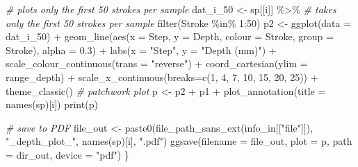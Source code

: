 \documentclass[
]{article}
\newenvironment{Shaded}{\begin{snugshade}}{\end{snugshade}}
\newcommand{\AttributeTok}[1]{\textcolor[rgb]{0.77,0.63,0.00}{#1}}
\newcommand{\CommentTok}[1]{\textcolor[rgb]{0.56,0.35,0.01}{\textit{#1}}}
\newcommand{\DecValTok}[1]{\textcolor[rgb]{0.00,0.00,0.81}{#1}}
\newcommand{\FloatTok}[1]{\textcolor[rgb]{0.00,0.00,0.81}{#1}}
\newcommand{\FunctionTok}[1]{\textcolor[rgb]{0.00,0.00,0.00}{#1}}
\newcommand{\NormalTok}[1]{#1}
\newcommand{\OtherTok}[1]{\textcolor[rgb]{0.56,0.35,0.01}{#1}}
\newcommand{\SpecialCharTok}[1]{\textcolor[rgb]{0.00,0.00,0.00}{#1}}
\newcommand{\StringTok}[1]{\textcolor[rgb]{0.31,0.60,0.02}{#1}}
\begin{document}
\begin{Shaded}
\begin{Highlighting}[]
\CommentTok{\# plots only the first 50 strokes per sample  }
\NormalTok{  dat\_i\_50 }\OtherTok{\textless{}{-}}\NormalTok{ sp[[i]] }\SpecialCharTok{\%\textgreater{}\%} 
              \CommentTok{\# takes only the first 50 strokes per sample}
              \FunctionTok{filter}\NormalTok{(Stroke }\SpecialCharTok{\%in\%} \DecValTok{1}\SpecialCharTok{:}\DecValTok{50}\NormalTok{)}
\NormalTok{  p2 }\OtherTok{\textless{}{-}} \FunctionTok{ggplot}\NormalTok{(}\AttributeTok{data =}\NormalTok{ dat\_i\_50) }\SpecialCharTok{+}
        \FunctionTok{geom\_line}\NormalTok{(}\FunctionTok{aes}\NormalTok{(}\AttributeTok{x =}\NormalTok{ Step, }\AttributeTok{y =}\NormalTok{ Depth, }\AttributeTok{colour =}\NormalTok{ Stroke, }\AttributeTok{group =}\NormalTok{ Stroke), }\AttributeTok{alpha =} \FloatTok{0.3}\NormalTok{) }\SpecialCharTok{+} 
        \FunctionTok{labs}\NormalTok{(}\AttributeTok{x =} \StringTok{"Step"}\NormalTok{, }\AttributeTok{y =} \StringTok{"Depth (mm)"}\NormalTok{) }\SpecialCharTok{+} 
        \FunctionTok{scale\_colour\_continuous}\NormalTok{(}\AttributeTok{trans =} \StringTok{"reverse"}\NormalTok{) }\SpecialCharTok{+} 
        \FunctionTok{coord\_cartesian}\NormalTok{(}\AttributeTok{ylim =}\NormalTok{ range\_depth) }\SpecialCharTok{+}
        \FunctionTok{scale\_x\_continuous}\NormalTok{(}\AttributeTok{breaks=}\FunctionTok{c}\NormalTok{(}\DecValTok{1}\NormalTok{, }\DecValTok{4}\NormalTok{, }\DecValTok{7}\NormalTok{, }\DecValTok{10}\NormalTok{, }\DecValTok{15}\NormalTok{, }\DecValTok{20}\NormalTok{, }\DecValTok{25}\NormalTok{)) }\SpecialCharTok{+}
          \FunctionTok{theme\_classic}\NormalTok{()}
  \CommentTok{\# patchwork plot}
\NormalTok{  p }\OtherTok{\textless{}{-}}\NormalTok{ p2 }\SpecialCharTok{+}\NormalTok{ p1 }\SpecialCharTok{+} \FunctionTok{plot\_annotation}\NormalTok{(}\AttributeTok{title =} \FunctionTok{names}\NormalTok{(sp)[i]) }
  \FunctionTok{print}\NormalTok{(p)}

  \CommentTok{\# save to PDF}
\NormalTok{  file\_out }\OtherTok{\textless{}{-}} \FunctionTok{paste0}\NormalTok{(}\FunctionTok{file\_path\_sans\_ext}\NormalTok{(info\_in[[}\StringTok{"file"}\NormalTok{]]), }\StringTok{"\_depth\_plot\_"}\NormalTok{, }
                \FunctionTok{names}\NormalTok{(sp)[i], }\StringTok{".pdf"}\NormalTok{)}
  \FunctionTok{ggsave}\NormalTok{(}\AttributeTok{filename =}\NormalTok{ file\_out, }\AttributeTok{plot =}\NormalTok{ p, }\AttributeTok{path =}\NormalTok{ dir\_out, }
         \AttributeTok{device =} \StringTok{"pdf"}\NormalTok{)}
\NormalTok{\}}
\end{Highlighting}
\end{Shaded}
\end{document}
